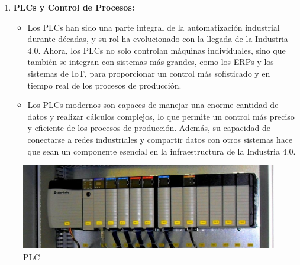 \documentclass[
  letterpaper,
]{book}
\providecommand{\tightlist}{%
  \setlength{\itemsep}{0pt}\setlength{\parskip}{0pt}}\usepackage{longtable,booktabs,array}
\begin{document}
\begin{enumerate}
\def\labelenumi{\arabic{enumi}.}
\setcounter{enumi}{1}
\tightlist
\item
  \textbf{PLCs y Control de Procesos:}

  \begin{itemize}
  \tightlist
  \item
    Los PLCs han sido una parte integral de la automatización industrial
    durante décadas, y su rol ha evolucionado con la llegada de la
    Industria 4.0. Ahora, los PLCs no solo controlan máquinas
    individuales, sino que también se integran con sistemas más grandes,
    como los ERPs y los sistemas de IoT, para proporcionar un control
    más sofisticado y en tiempo real de los procesos de producción.
  \item
    Los PLCs modernos son capaces de manejar una enorme cantidad de
    datos y realizar cálculos complejos, lo que permite un control más
    preciso y eficiente de los procesos de producción. Además, su
    capacidad de conectarse a redes industriales y compartir datos con
    otros sistemas hace que sean un componente esencial en la
    infraestructura de la Industria 4.0.
  \end{itemize}
\end{enumerate}

\begin{figure}[H]

{\centering \includegraphics{Img/plc.jpg}

}

\caption{PLC}

\end{figure}%
\end{document}
